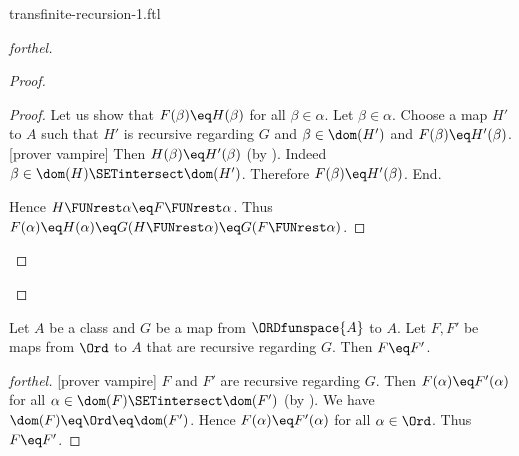 \documentclass{naproche-library}
\begin{document}
\begin{smodule}[title=Transfinite Recursion I]{transfinite-recursion-1.ftl}
\begin{proof}[forthel]
\begin{proof}
\begin{proof}
      Let us show that $F(\beta) \eq H(\beta)$ for all $\beta \in \alpha$.
        Let $\beta \in \alpha$.
        Choose a map $H'$ to $A$ such that $H'$ is recursive regarding $G$ and $\beta \in \dom(H')$ and $F(\beta) \eq H'(\beta)$.
        [prover vampire]
        Then $H(\beta) \eq H'(\beta)$ (by ).
        Indeed $\beta \in \dom(H) \SETintersect \dom(H')$.
        Therefore $F(\beta) \eq H'(\beta)$.
      End.

      Hence $H \FUNrest \alpha \eq F \FUNrest \alpha$.
      Thus $F(\alpha)
        \eq H(\alpha)
        \eq G(H \FUNrest \alpha)
        \eq G(F \FUNrest \alpha)$.
    \end{proof}
  \end{proof}
\end{proof}

\begin{theorem}[forthel,title=Transfinite Recursion Theorem: Uniqueness,id=transfinite-recursion_uniqueness]
  Let $A$ be a class and $G$ be a map from $\ORDfunspace{A}$ to $A$.
  Let $F, F'$ be maps from $\Ord$ to $A$ that are recursive regarding $G$.
  Then $F \eq F'$.
\end{theorem}
\begin{proof}[forthel]
  [prover vampire]
  $F$ and $F'$ are recursive regarding $G$.
  Then $F(\alpha) \eq F'(\alpha)$ for all $\alpha \in \dom(F) \SETintersect \dom(F')$ (by ).
  We have $\dom(F) \eq \Ord \eq \dom(F')$.
  Hence $F(\alpha) \eq F'(\alpha)$ for all $\alpha \in \Ord$.
  Thus $F \eq F'$.
\end{proof}
\end{smodule}
\end{document}
